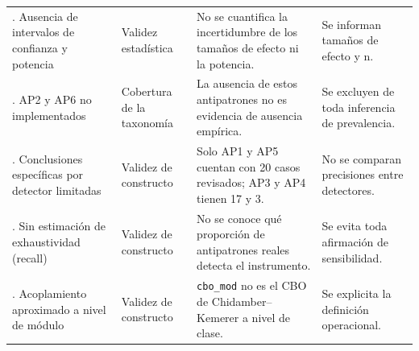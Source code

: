 \begin{table}[t]
\begin{tabularx}{\textwidth}{@{} >{\raggedright\arraybackslash}p{3.6cm} >{\raggedright\arraybackslash}p{2.3cm} >{\raggedright\arraybackslash}X >{\raggedright\arraybackslash}p{3.8cm} @{}}
10. Ausencia de intervalos de confianza y potencia & Validez estadística & No se cuantifica la incertidumbre de los tamaños de efecto ni la potencia. & Se informan tamaños de efecto y n. \\
11. AP2 y AP6 no implementados & Cobertura de la taxonomía & La ausencia de estos antipatrones no es evidencia de ausencia empírica. & Se excluyen de toda inferencia de prevalencia. \\
12. Conclusiones específicas por detector limitadas & Validez de constructo & Solo AP1 y AP5 cuentan con 20 casos revisados; AP3 y AP4 tienen 17 y 3. & No se comparan precisiones entre detectores. \\
13. Sin estimación de exhaustividad (recall) & Validez de constructo & No se conoce qué proporción de antipatrones reales detecta el instrumento. & Se evita toda afirmación de sensibilidad. \\
14. Acoplamiento aproximado a nivel de módulo & Validez de constructo & \texttt{cbo\_mod} no es el CBO de Chidamber--Kemerer a nivel de clase. & Se explicita la definición operacional. \\
\bottomrule
\end{tabularx}
\end{table}